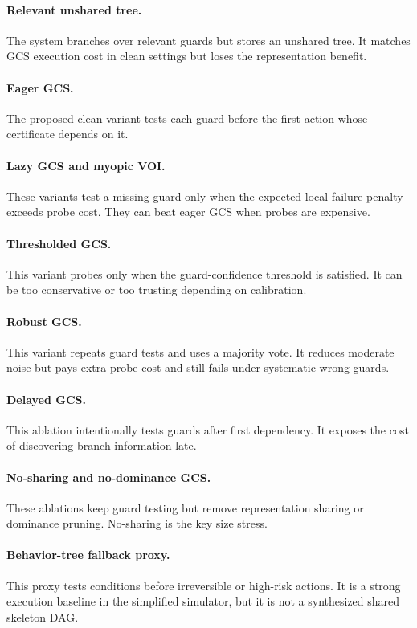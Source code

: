 \documentclass{article}
\begin{document}
\paragraph{Relevant unshared tree.}
The system branches over relevant guards but stores an unshared tree. It matches GCS execution cost in clean settings but loses the representation benefit.

\paragraph{Eager GCS.}
The proposed clean variant tests each guard before the first action whose certificate depends on it.

\paragraph{Lazy GCS and myopic VOI.}
These variants test a missing guard only when the expected local failure penalty exceeds probe cost. They can beat eager GCS when probes are expensive.

\paragraph{Thresholded GCS.}
This variant probes only when the guard-confidence threshold is satisfied. It can be too conservative or too trusting depending on calibration.

\paragraph{Robust GCS.}
This variant repeats guard tests and uses a majority vote. It reduces moderate noise but pays extra probe cost and still fails under systematic wrong guards.

\paragraph{Delayed GCS.}
This ablation intentionally tests guards after first dependency. It exposes the cost of discovering branch information late.

\paragraph{No-sharing and no-dominance GCS.}
These ablations keep guard testing but remove representation sharing or dominance pruning. No-sharing is the key size stress.

\paragraph{Behavior-tree fallback proxy.}
This proxy tests conditions before irreversible or high-risk actions. It is a strong execution baseline in the simplified simulator, but it is not a synthesized shared skeleton DAG.
\end{document}
